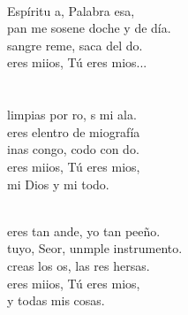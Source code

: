 \begin{cancion}%
	       \\
	Espíritu a, Palabra esa, \\
	pan me sosene doche y de día.\\
	sangre reme, saca del do.\\
	 eres miios, Tú eres mios...\\
\jump\\
	      \\
	limpias por ro, s mi ala. \\
	 eres elentro de miografía\\
	inas congo,  codo con do.\\
	 eres miios, Tú eres mios,\\
mi Dios y mi todo.\\\jump\\
	\begin{chorus}%
	 eres tan ande, yo  tan peeño. \\
	 tuyo, Seor, unmple instrumento.\\
	 creas los os, las res hersas.  \\
	 eres miios, Tú eres mios,\\
y todas mis cosas.\\
	\end{chorus}%
	\jump\\
	      \\

\end{cancion}
